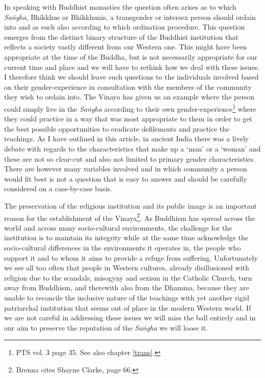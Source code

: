 In speaking with Buddhist monastics the question often arises as to which {\em Saṅgha}, Bhikkhus or Bhikkhunis, a transgender or intersex person should ordain into and as such also according to which ordination procedure. This question emerges from the distinct binary structure of the Buddhist institution that reflects a society vastly different from our Western one. This might have been appropriate at the time of the Buddha, but is not necessarily appropriate for our current time and place and we will have to rethink how we deal with these issues. I therefore think we should leave such questions to the individuals involved based on their gender-experience in consultation with the members of the community they wish to ordain into. The Vinaya has given us an example where the person could simply live in the {\em Saṅgha} according to their own gender-experience\footnote{PTS vol. 3 page 35. See also chapter \ref{trans}.} where they could practice in a way that was most appropriate to them in order to get the best possible opportunities to eradicate defilements and practice the teachings. As I have outlined in this article, in ancient India there was a lively debate with regards to the characteristics that make up a `man' or a `woman' and these are not so clear-cut and also not limited to primary gender characteristics. There are however many variables involved and in which community a person would fit best is not a question that is easy to answer and should be carefully considered on a case-by-case basis. 

The preservation of the religious institution and its public image is an important reason for the establishment of the Vinaya\footnote{Brenna \cite{artinger} cites Shayne Clarke, page 66.}. As Buddhism has spread across the world and across many socio-cultural environments, the challenge for the institution is to maintain its integrity while at the same time acknowledge the socio-cultural differences in the environments it operates in, the people who support it and to whom it aims to provide a refuge from suffering. Unfortunately we see all too often that people in Western cultures, already disillusioned with religion due to the scandals, misogyny and sexism in the Catholic Church, turn away from Buddhism, and therewith also from the Dhamma, because they are unable to reconcile the inclusive nature of the teachings with yet another rigid patriarchal institution that seems out of place in the modern Western world. If we are not careful in addressing these issues we will miss the ball entirely and in our aim to preserve the reputation of the {\em Saṅgha} we will loose it.

